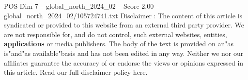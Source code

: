\begin{textsample}{POS Dim 7 – global\_north\_2024\_02 – Score 2.00 – global\_north\_2024\_02/105724741.txt}
Disclaimer : The content of this article is syndicated or provided to this website from an external third party provider.
We are not responsible for, and do not control, such external websites, entities, \textbf{applications} or media publishers.
The body of the text is provided on an"as is"and"as available"basis and has not been edited in any way.
Neither we nor our affiliates guarantee the accuracy of or endorse the views or opinions expressed in this article.
Read our full disclaimer policy here.

\end{textsample}
